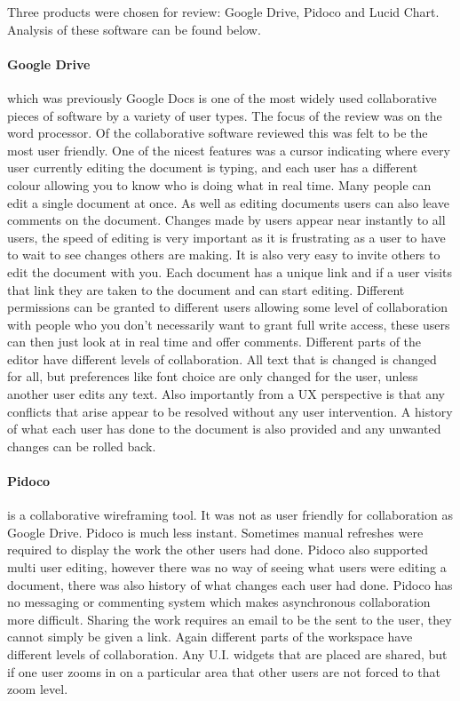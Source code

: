 Three products were chosen for review: Google Drive, Pidoco and Lucid Chart.  Analysis of these software can be found below.

\paragraph{Google Drive} which was previously Google Docs is one of the most widely used collaborative pieces of software by a variety of user types.  The focus of the review was on the word processor.  Of the collaborative software reviewed this was felt to be the most user friendly.  One of the nicest features was a cursor indicating where every user currently editing the document is typing, and each user has a different colour allowing you to know who is doing what in real time.  Many people can edit a single document at once.  As well as editing documents users can also leave comments on the document.  Changes made by users appear near instantly to all users, the speed of editing is very important as it is frustrating as a user to have to wait to see changes others are making.  It is also very easy to invite others to edit the document with you.  Each document has a unique link and if a user visits that link they are taken to the document and can start editing.  Different permissions can be granted to different users allowing some level of collaboration with people who you don't necessarily want to grant full write access, these users can then just look at in real time and offer comments.  Different parts of the editor have different levels of collaboration.  All text that is changed is changed for all, but preferences like font choice are only changed for the user, unless another user edits any text.  Also importantly from a UX perspective is that any conflicts that arise appear to be resolved without any user intervention.  A history of what each user has done to the document is also provided and any unwanted changes can be rolled back.

\paragraph{Pidoco} is a collaborative wireframing tool.  It was not as user friendly for collaboration as Google Drive.  Pidoco is much less instant.  Sometimes manual refreshes were required to display the work the other users had done.  Pidoco also supported multi user editing, however there was no way of seeing what users were editing a document, there was also history of what changes each user had done.  Pidoco has no messaging or commenting system which makes asynchronous collaboration more difficult.  Sharing the work requires an email to be the sent to the user, they cannot simply be given a link.  Again different parts of the workspace have different levels of collaboration.  Any U.I. widgets that are placed are shared, but if one user zooms in on a particular area that other users are not forced to that zoom level.

